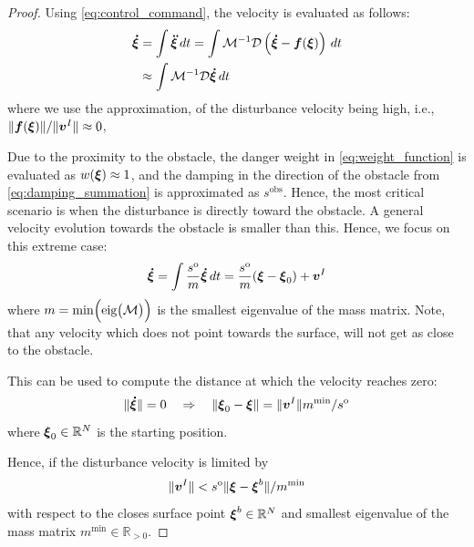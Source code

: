 \begin{proof}
Using \eqref{eq:control_command}, the velocity is evaluated as follows:
\begin{equation}
\begin{split}
    \boldsymbol{\dot \xi} & = \int \boldsymbol{\ddot \xi} \, dt 
    = \int \mathcal{M}^{-1} \mathcal{D}  \left( \boldsymbol{\dot \xi} - \boldsymbol{f}(\boldsymbol{\xi}) \right) \, dt \\
    & \approx \int \mathcal{M}^{-1} \mathcal{D} \boldsymbol{\dot \xi} \, dt
\end{split}
\end{equation}
where we use the approximation, of the disturbance velocity being high, i.e., $\| \boldsymbol{f}(\boldsymbol{\xi}) \| / \|\boldsymbol{v}^I \| \approx 0 $, 

Due to the proximity to the obstacle, the danger weight in \eqref{eq:weight_function} is evaluated as $w(\boldsymbol{\xi}) \approx 1$, and the damping in the direction of the obstacle from \eqref{eq:damping_summation} is approximated as $s^{\mathrm{obs}}$. 
Hence, the most critical scenario is when the disturbance is directly toward the obstacle. A general velocity evolution towards the obstacle is smaller than this.
Hence, we focus on this extreme case:
\begin{equation}
    \vecs{\dot \xi} = \int \frac{s^{\mathrm{o}}}{m} \vecs{ \dot \xi} \, dt = \frac{s^{\mathrm{o}}}{m} (\vecs{\xi} - \vecs \xi_0)  + \vecs v^I \label{eq:velocity_with_control}
\end{equation}
where $m = \min \Bigl(\text{eig} \bigl(\mathcal{M} \bigr) \Bigr)$ is the smallest eigenvalue of the mass matrix. Note, that any velocity which does not point towards the surface, will not get as close to the obstacle.

This can be used to compute the distance at which the velocity reaches zero:
\begin{equation}
    \| \boldsymbol{\dot \xi} \| = 0
    \quad \Rightarrow \quad
    \|\boldsymbol{\xi}_0 - \boldsymbol{\xi} \| = \| \boldsymbol{v}^I \| {m^{\mathrm{min}}} / {s^{\mathrm{o}}} 
\end{equation}
where $\boldsymbol{\xi}_0 \in \mathbb{R}^N $ is the starting position. 

Hence, if the disturbance velocity is limited by 
\begin{equation}
    \| \boldsymbol{v}^I \| < s^{\mathrm{o}} \| \boldsymbol{\xi} - \boldsymbol{\xi}^b \| / m^{\mathrm{min}}
\end{equation}
with respect to the closes surface point $\boldsymbol{\xi}^b \in \mathbb{R}^N$ and smallest eigenvalue of the mass matrix $m^{\mathrm{min}} \in \mathbb{R}_{>0}$.
\end{proof}

